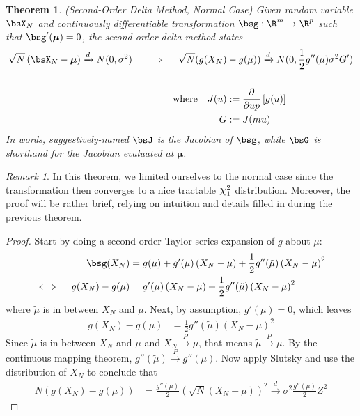 \documentclass[12pt]{article}
\theoremstyle{plain}
\newtheorem{thm}{Theorem}[section]
\theoremstyle{definition}
\theoremstyle{remark}
\newtheorem*{rmk}{Remark}
\newcommand*{\Chi}{\mbox{\large$\chi$}} %
\newcommand{\bsmu}{\boldsymbol{\mu}}
\newcommand{\pto}{\xrightarrow{P}}
\newcommand{\dto}{\xrightarrow{d}}
\begin{document}
\begin{thm}\emph{(Second-Order Delta Method, Normal Case)}
Given random variable $\bsX_N$ and continuously differentiable
transformation $\bsg:\R^m\rightarrow \R^p$
such that $\bsg'(\bsmu)=0$, the \emph{second-order delta method} states
\begin{align*}
  \sqrt{N}\left( \bsX_N -\bsmu \right)
  \dto N(0,\sigma^2)
  \quad\implies\quad
  \sqrt{N}(
  g(X_N) &- g(\mu))
  \dto
  N(0, \frac{1}{2}g''(\mu) \sigma^2 G')
  \\\\
  \text{where}\quad
  J(u)
  &:=\frac{\partial}{\partial up}
  \left[g(u)\right]\\
  G &:= J(mu)
\end{align*}
In words, suggestively-named $\bsJ$ is the Jacobian of $\bsg$, while
$\bsG$ is shorthand for the Jacobian evaluated at $\bsmu$.
\end{thm}
\begin{rmk}
In this theorem, we limited ourselves to the normal case since the
transformation then converges to a nice tractable $\Chi^2_1$
distribution. Moreover, the proof will be rather brief, relying on
intuition and details filled in during the previous theorem.
\end{rmk}
\begin{proof}
Start by doing a second-order Taylor series expansion of $g$ about $\mu$:
\begin{align*}
  \bsg(X_N)
  &=
  g(\mu)
  + g'(\mu) \left( X_N - \mu \right)
  + \frac{1}{2}g''(\tilde{\mu}) \left( X_N - \mu \right)^2
  \\
  \iff\quad
  g(X_N) - g(\mu)
  &=
  g'(\mu) \left( X_N - \mu \right)
  + \frac{1}{2}g''(\tilde{\mu}) \left( X_N - \mu \right)^2
\end{align*}
where $\tilde{\mu}$ is in between $X_N$ and $\mu$.
Next, by assumption, $g'(\mu)=0$, which leaves
\begin{align*}
  g(X_N) - g(\mu)
  &=
  \frac{1}{2}g''(\tilde{\mu}) \left( X_N - \mu \right)^2
\end{align*}
Since $\tilde{\mu}$ is in between $X_N$ and $\mu$ and
$X_N\pto \mu$, that means $\tilde{\mu}\pto \mu$.
By the continuous mapping theorem, $g''(\tilde{\mu})\pto g''(\mu)$.
Now apply Slutsky and use the distribution of $X_N$ to conclude that
\begin{align*}
  N\left(g(X_N) - g(\mu)\right)
  &=
  \frac{g''(\mu)}{2}
  \left(\sqrt{N}  \left( X_N - \mu \right) \right)^2
  \dto
  \sigma^2 \frac{g''(\mu)}{2} Z^2
\end{align*}
\end{proof}
\end{document}
